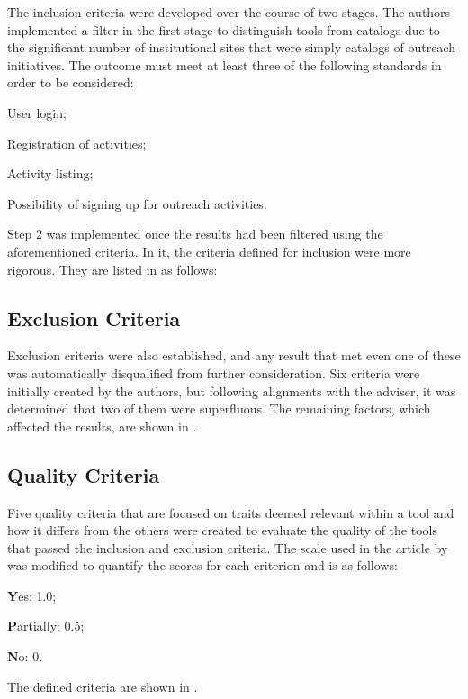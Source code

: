 The inclusion criteria were developed over the course of two stages. The authors implemented a filter in the first stage to distinguish tools from catalogs due to the significant number of institutional sites that were simply catalogs of outreach initiatives. The outcome must meet at least three of the following standards in order to be considered:
\begin{inparaenum}[(a)]
  \item User login;
  \item Registration of activities;
  \item Activity listing;
  \item Possibility of signing up for outreach activities.
\end{inparaenum}

Step 2 was implemented once the results had been filtered using the aforementioned criteria. In it, the criteria defined for inclusion were more rigorous. They are listed in  as follows:



\subsection{Exclusion Criteria}\label{sec:gl-planning-exc}

Exclusion criteria were also established, and any result that met even one of these was automatically disqualified from further consideration. Six criteria were initially created by the authors, but following alignments with the adviser, it was determined that two of them were superfluous. The remaining factors, which affected the results, are shown in .



\subsection{Quality Criteria}\label{sec:gl-planning-qlty}

Five quality criteria that are focused on traits deemed relevant within a tool and how it differs from the others were created to evaluate the quality of the tools that passed the inclusion and exclusion criteria. The scale used in the article by \textcite{iung2020systematic} was modified to quantify the scores for each criterion and is as follows:
\begin{inparaenum}[(i)]
  \item \textbf{Y}es: 1.0;
  \item \textbf{P}artially: 0.5;
  \item \textbf{N}o: 0.
\end{inparaenum}
The defined criteria are shown in .

